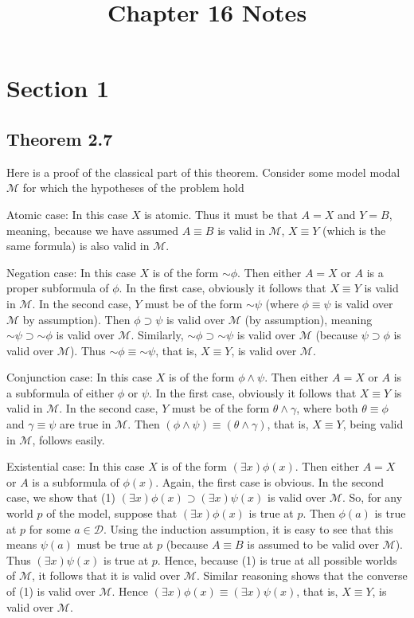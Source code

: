 \documentclass{article}
\title{Chapter 16 Notes}
\newcommand*{\oldneg}{\mathord{\sim}}
\theoremstyle{definition}
\begin{document}
\date{}
\maketitle

\section*{Section 1}

\subsection*{Theorem 2.7}
Here is a proof of the classical part of this theorem. Consider some model modal 
$\mathcal{M}$ for which the hypotheses of the problem hold

Atomic case: In this case $X$ is atomic. Thus it must be that $A=X$ and $Y=B$, meaning, because 
we have assumed $A\equiv B$ is valid in $\mathcal{M}$, $X\equiv Y$ (which is the same formula) is also valid in $\mathcal{M}$.

Negation case: In this case $X$ is of the form $\oldneg\phi$. Then either $A=X$ or 
$A$ is a proper subformula of $\phi$. In the first case, obviously it follows that $X\equiv Y$ is valid in 
$\mathcal{M}$. In the second case, $Y$ must be of the form $\oldneg\psi$ (where $\phi\equiv\psi$ is valid over 
$\mathcal{M}$ by assumption). Then $\phi\supset\psi$ is valid over $\mathcal{M}$ (by assumption), meaning 
$\oldneg\psi\supset\oldneg\phi$ is valid over $\mathcal{M}$. Similarly, 
$\oldneg\phi\supset\oldneg\psi$ is valid over $\mathcal{M}$ (because $\psi\supset\phi$ is valid over $\mathcal{M}$).
Thus $\oldneg\phi\equiv\oldneg\psi$, that is, $X\equiv Y$, is valid over $\mathcal{M}$.

Conjunction case: In this case $X$ is of the form $\phi\wedge\psi$. Then either $A=X$ or 
$A$ is a subformula of either $\phi$ or $\psi$. In the first case, obviously it follows that 
$X\equiv Y$ is valid in $\mathcal{M}$. In the second case, $Y$ must be of the form 
$\theta\wedge\gamma$, where both $\theta\equiv\phi$ and $\gamma\equiv\psi$ are true in $\mathcal{M}$.
Then $(\phi\wedge\psi)\equiv(\theta\wedge\gamma)$, that is, $X\equiv Y$, being valid in $\mathcal{M}$, follows 
easily.

Existential case: In this case $X$ is of the form $(\exists x)\phi(x)$. Then either $A=X$ or 
$A$ is a subformula of $\phi(x)$. Again, the first case is obvious. In the second case, we show that 
(1) $(\exists x)\phi(x)\supset (\exists x)\psi(x)$ is valid over $\mathcal{M}$. So, for any world $p$ of the 
model, suppose that $(\exists x)\phi(x)$ is true at $p$. Then $\phi(a)$ is true at $p$ for some 
$a\in\mathcal{D}$. Using the induction assumption, it is easy to see that this means $\psi(a)$ must be true at $p$ (because $A\equiv B$ is assumed to be 
valid over $\mathcal{M}$). Thus $(\exists x)\psi(x)$ is true at $p$. Hence, because (1) is true at all possible worlds of 
$\mathcal{M}$, it follows that it is valid over $\mathcal{M}$. Similar reasoning shows that the converse of 
(1) is valid over $\mathcal{M}$. Hence $(\exists x)\phi(x)\equiv(\exists x)\psi(x)$, that is, 
$X\equiv Y$, is valid over $\mathcal{M}$. 
\end{document}
